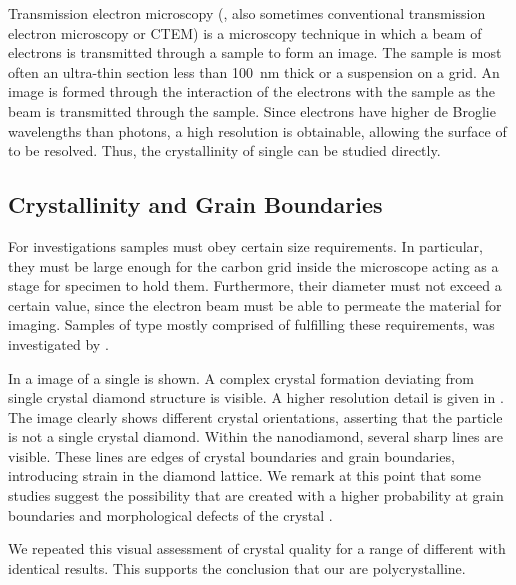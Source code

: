 			Transmission electron microscopy (\TEM, also sometimes conventional transmission electron microscopy or CTEM) is a microscopy technique in which a beam of electrons is transmitted through a sample to form an image. The sample is most often an ultra-thin section less than \SI{100}{\nm} thick or a suspension on a grid. An image is formed through the interaction of the electrons with the sample as the beam is transmitted through the sample.
			Since electrons have higher de Broglie wavelengths than photons, a high resolution is obtainable, allowing the surface of \nds to be resolved. Thus, the crystallinity of single \nds can be studied directly.

			\subsection{Crystallinity and Grain Boundaries}\label{subsec::tem_crystal}

				For \TEM investigations \nd samples must obey certain size requirements.
				In particular, they must be large enough for the carbon grid inside the microscope acting as a stage for specimen to hold them.
				Furthermore, their diameter must not exceed a certain value, since the \TEM electron beam must be able to permeate the material for imaging.
				Samples of type \insituH mostly comprised of \nds fulfilling these requirements, was investigated by \schmauch.
				
				In  a \TEM image of a single \nd is shown. A complex crystal formation deviating from single crystal diamond structure is visible. A higher resolution detail is given in . The image clearly shows different crystal orientations, asserting that the \nd particle is not a single crystal diamond. Within the nanodiamond, several sharp lines are visible. These lines are edges of crystal boundaries and grain boundaries, introducing strain in the diamond lattice. We remark at this point that some studies suggest the possibility that \sivs are created with a higher probability at grain boundaries and morphological defects of the crystal \cite{bray2016localization, zapol2001tight}.
				
				We repeated this visual assessment of crystal quality for a range of different \nds with identical results. This supports the conclusion that our \nds are polycrystalline.

